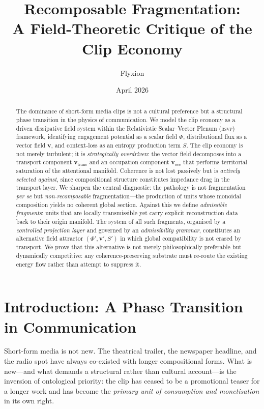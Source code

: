 \documentclass{amsart}
\title[Recomposable Fragmentation]{%
  Recomposable Fragmentation:\\[4pt]
  \large A Field-Theoretic Critique of the Clip Economy
}
\author{Flyxion}
\date{April 2026}
\theoremstyle{plain}
\theoremstyle{definition}
\theoremstyle{remark}
\newcommand{\RSVP}{\textsc{rsvp}}
\newcommand{\scalar}{\Phi}
\newcommand{\vfield}{\mathbf{v}}
\newcommand{\entr}{S}
\newcommand{\vtrans}{\mathbf{v}_{\!\text{trans}}}
\newcommand{\vocc}{\mathbf{v}_{\!\text{occ}}}
\begin{document}
\begin{abstract}
The dominance of short-form media clips is not a cultural preference but a
structural phase transition in the physics of communication.  We model the clip
economy as a driven dissipative field system within the Relativistic
Scalar--Vector Plenum (\RSVP) framework, identifying engagement potential as a
scalar field $\scalar$, distributional flux as a vector field $\vfield$, and
context-loss as an entropy production term $\entr$.  The clip economy is not
merely turbulent; it is \emph{strategically overdriven}: the vector field
decomposes into a transport component $\vtrans$ and an occupation component
$\vocc$ that performs territorial saturation of the attentional manifold.
Coherence is not lost passively but is \emph{actively selected against}, since
compositional structure constitutes impedance drag in the transport layer.  We
sharpen the central diagnostic: the pathology is not fragmentation \emph{per se}
but \emph{non-recomposable} fragmentation---the production of units whose monoidal
composition yields no coherent global section.  Against this we define
\emph{admissible fragments}: units that are locally transmissible yet carry
explicit reconstruction data back to their origin manifold.  The system of all
such fragments, organised by a \emph{controlled projection layer} and governed by
an \emph{admissibility grammar}, constitutes an alternative field attractor
$(\scalar', \vfield', \entr')$ in which global compatibility is not erased by
transport.  We prove that this alternative is not merely philosophically preferable
but dynamically competitive: any coherence-preserving substrate must re-route the
existing energy flow rather than attempt to suppress it.
\end{abstract}

\maketitle
\newpage
\tableofcontents
\newpage

\section{Introduction: A Phase Transition in Communication}
\label{sec:intro}

Short-form media is not new.  The theatrical trailer, the newspaper headline, and
the radio spot have always co-existed with longer compositional forms.  What is
new---and what demands a structural rather than cultural account---is the inversion
of ontological priority: the clip has ceased to be a promotional teaser for a
longer work and has become the \emph{primary unit of consumption and monetisation}
in its own right.
\end{document}
